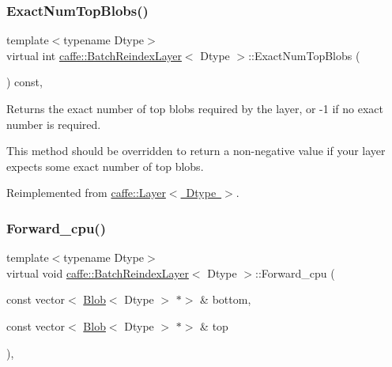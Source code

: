 \subsubsection{\texorpdfstring{Exact\+Num\+Top\+Blobs()}{ExactNumTopBlobs()}\hspace{0.1cm}{\footnotesize\ttfamily [2/2]}}
{\footnotesize\ttfamily template$<$typename Dtype$>$ \\
virtual int \mbox{\hyperlink{classcaffe_1_1_batch_reindex_layer}{caffe\+::\+Batch\+Reindex\+Layer}}$<$ Dtype $>$\+::Exact\+Num\+Top\+Blobs (\begin{DoxyParamCaption}{ }\end{DoxyParamCaption}) const\hspace{0.3cm}{\ttfamily [inline]}, {\ttfamily [virtual]}}



Returns the exact number of top blobs required by the layer, or -\/1 if no exact number is required. 

This method should be overridden to return a non-\/negative value if your layer expects some exact number of top blobs. 

Reimplemented from \mbox{\hyperlink{classcaffe_1_1_layer_a64e2ca72c719e4b2f1f9216ccfb0d37f}{caffe\+::\+Layer$<$ Dtype $>$}}.

\mbox{\label{classcaffe_1_1_batch_reindex_layer_aba17361a36c34e4b08609d22902e7501}} 
\subsubsection{\texorpdfstring{Forward\+\_\+cpu()}{Forward\_cpu()}\hspace{0.1cm}{\footnotesize\ttfamily [1/2]}}
{\footnotesize\ttfamily template$<$typename Dtype$>$ \\
virtual void \mbox{\hyperlink{classcaffe_1_1_batch_reindex_layer}{caffe\+::\+Batch\+Reindex\+Layer}}$<$ Dtype $>$\+::Forward\+\_\+cpu (\begin{DoxyParamCaption}\item[{const vector$<$ \mbox{\hyperlink{classcaffe_1_1_blob}{Blob}}$<$ Dtype $>$ $\ast$$>$ \&}]{bottom,  }\item[{const vector$<$ \mbox{\hyperlink{classcaffe_1_1_blob}{Blob}}$<$ Dtype $>$ $\ast$$>$ \&}]{top }\end{DoxyParamCaption})\hspace{0.3cm}{\ttfamily [protected]}, {\ttfamily [virtual]}}


